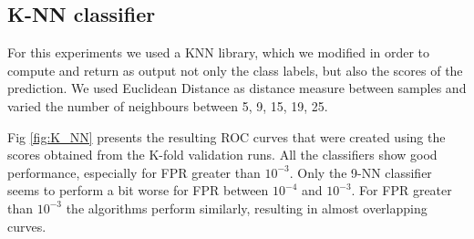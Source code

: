 \subsection{K-NN classifier}
\noindent For this experiments we used a KNN library, which we modified in order to compute and return as output not only the class labels, but also the scores of the prediction.
We used Euclidean Distance as distance measure between samples and varied the number of neighbours between 5, 9, 15, 19, 25. 

\noindent Fig \ref{fig:K_NN} presents the resulting ROC curves that were created using the scores obtained from the K-fold validation runs. All the classifiers show good performance, especially for FPR greater than $10^{-3}$. Only the 9-NN classifier seems to perform a bit worse for FPR between $10^{-4}$ and $10^{-3}$. For FPR greater than  $10^{-3}$
the algorithms perform similarly, resulting in almost overlapping curves.

